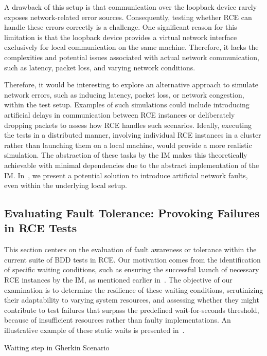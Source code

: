 A drawback of this setup is that communication over the loopback device rarely exposes network-related error sources. Consequently, testing whether RCE can handle these errors correctly is a challenge. One significant reason for this limitation is that the loopback device provides a virtual network interface exclusively for local communication on the same machine. Therefore, it lacks the complexities and potential issues associated with actual network communication, such as latency, packet loss, and varying network conditions.


Therefore, it would be interesting to explore an alternative approach to simulate network errors, such as inducing latency, packet loss, or network congestion, within the test setup. Examples of such simulations could include introducing artificial delays in communication between \ac{RCE} instances or deliberately dropping packets to assess how \ac{RCE} handles such scenarios. Ideally, executing the tests in a distributed manner, involving individual \ac{RCE} instances in a cluster rather than launching them on a local machine, would provide a more realistic simulation. The abstraction of these tasks by the \ac{IM} makes this theoretically achievable with minimal dependencies due to the abstract implementation of the \ac{IM}. In~, we present a potential solution to introduce artificial network faults, even within the underlying local setup.

\subsection{Evaluating Fault Tolerance: Provoking Failures in \ac{RCE} Tests}
\label{subsec:fault-tolerance}
This section centers on the evaluation of fault awareness or tolerance within the current suite of \ac{BDD} tests in \ac{RCE}. Our motivation comes from the identification of specific waiting conditions, such as ensuring the successful launch of necessary RCE instances by the \ac{IM}, as mentioned earlier in~. The objective of our examination is to determine the resilience of these waiting conditions, scrutinizing their adaptability to varying system resources, and assessing whether they might contribute to test failures that surpass the predefined wait-for-seconds threshold, because of insufficient resources rather than faulty implementations. An illustrative example of these static waits is presented in~.

\begin{listing}[!ht]
\caption{Waiting step in Gherkin Scenario}
\label{lst:staticwait}
\inputminted[linenos, xleftmargin=2em]{gherkin}{files/code/staticwait.feature}
\end{listing}

